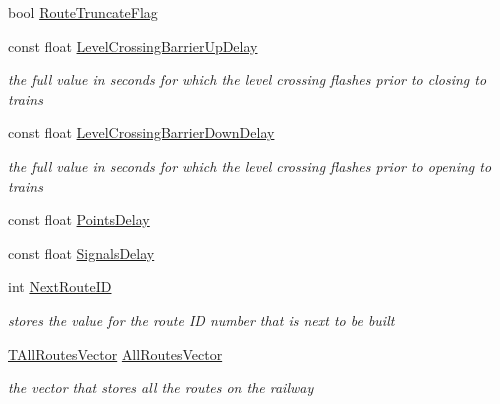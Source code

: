 \begin{DoxyCompactItemize}
\item 
bool \mbox{\hyperlink{class_t_all_routes_a86d544429dcddbcbe43e63c8879128ee}{Route\+Truncate\+Flag}}
\item 
\mbox{\label{class_t_all_routes_a753f581cd8fb39826bea73c7419398fb}} 
const float \mbox{\hyperlink{class_t_all_routes_a753f581cd8fb39826bea73c7419398fb}{Level\+Crossing\+Barrier\+Up\+Delay}}
\begin{DoxyCompactList}\small\item\em the full value in seconds for which the level crossing flashes prior to closing to trains \end{DoxyCompactList}\item 
\mbox{\label{class_t_all_routes_a493783f7ff267d2dcf347f1958714d72}} 
const float \mbox{\hyperlink{class_t_all_routes_a493783f7ff267d2dcf347f1958714d72}{Level\+Crossing\+Barrier\+Down\+Delay}}
\begin{DoxyCompactList}\small\item\em the full value in seconds for which the level crossing flashes prior to opening to trains \end{DoxyCompactList}\item 
const float \mbox{\hyperlink{class_t_all_routes_a7f0e30f383ca3cb65ab72d102c162316}{Points\+Delay}}
\item 
const float \mbox{\hyperlink{class_t_all_routes_a7183b12f8de4fcb82e036252a37d574d}{Signals\+Delay}}
\item 
\mbox{\label{class_t_all_routes_a936864598364d2e8c0aea147fea11196}} 
int \mbox{\hyperlink{class_t_all_routes_a936864598364d2e8c0aea147fea11196}{Next\+Route\+ID}}
\begin{DoxyCompactList}\small\item\em stores the value for the route ID number that is next to be built \end{DoxyCompactList}\item 
\mbox{\label{class_t_all_routes_a0c036524b1264c39fa5fd533788d8fae}} 
\mbox{\hyperlink{class_t_all_routes_a34636f74b522ec911900fce48ea6667c}{T\+All\+Routes\+Vector}} \mbox{\hyperlink{class_t_all_routes_a0c036524b1264c39fa5fd533788d8fae}{All\+Routes\+Vector}}
\begin{DoxyCompactList}\small\item\em the vector that stores all the routes on the railway \end{DoxyCompactList}\item 

\end{DoxyCompactItemize}
